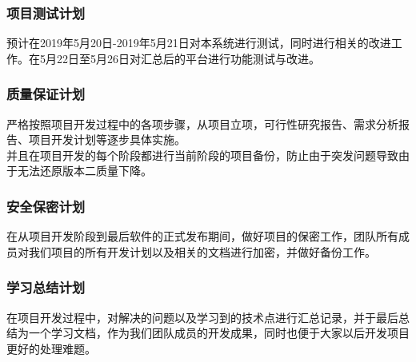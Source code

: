 \documentclass[
]{article}
\begin{document}
\hypertarget{header-n629}{%
\subsubsection{项目测试计划}\label{header-n629}}

预计在2019年5月20日-2019年5月21日对本系统进行测试，同时进行相关的改进工作。在5月22日至5月26日对汇总后的平台进行功能测试与改进。

\hypertarget{header-n631}{%
\subsubsection{质量保证计划}\label{header-n631}}

严格按照项目开发过程中的各项步骤，从项目立项，可行性研究报告、需求分析报告、项目开发计划等逐步具体实施。\\
并且在项目开发的每个阶段都进行当前阶段的项目备份，防止由于突发问题导致由于无法还原版本二质量下降。

\hypertarget{header-n633}{%
\subsubsection{安全保密计划}\label{header-n633}}

在从项目开发阶段到最后软件的正式发布期间，做好项目的保密工作，团队所有成员对我们项目的所有开发计划以及相关的文档进行加密，并做好备份工作。

\hypertarget{header-n635}{%
\subsubsection{学习总结计划}\label{header-n635}}

在项目开发过程中，对解决的问题以及学习到的技术点进行汇总记录，并于最后总结为一个学习文档，作为我们团队成员的开发成果，同时也便于大家以后开发项目更好的处理难题。
\end{document}
